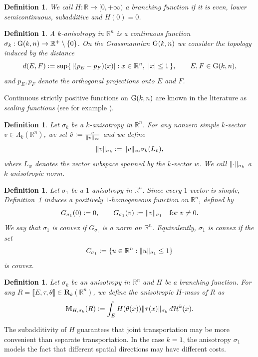 \documentclass{article}
\numberwithin{equation}{section}
\theoremstyle{plain}%
\newtheorem{defin}[theorem]{Definition}
\theoremstyle{definition}
\theoremstyle{definition}
\newcommand{\rgrande}{\mathbb{R}}
\newcommand{\haus}{\mathcal{H}}
\newcommand{\corrett}{\mathbf{R}_k(\rgrande^n)}
\newcommand{\massaanisotropa}{\mathbb{M}_{H,\sigma_k}}
\newcommand{\grass}{{\rm G}}
\newcommand{\grasskn}{\grass(k,n)}
\newcommand{\vettgen}[2]{\Lambda_{#1}(\rgrande^{#2})}
\DeclarePairedDelimiter{\norma}{\lVert}{\rVert} %
\begin{document}
\begin{defin}
    We call $H: \rgrande \to [ 0,+ \infty)$ a \textit{branching function} if it is even, lower semicontinuous, subadditive and $H(0)=0$.
\end{defin}
\begin{defin}
    A \textit{$k$-anisotropy in $\rgrande^n$} is a continuous function $\sigma_k : \grasskn \to \rgrande^+ \setminus \{ 0 \}$. On the Grassmannian $\grasskn$ we consider the topology induced by the distance  
    $$d(E,F)\vcentcolon=
    \sup\{\, |(p_E-p_F)(x)| : x\in \rgrande^n,\ |x|\le 1\,\},
    \qquad E,F\in\grasskn,$$
    and $p_E,p_F$ denote the orthogonal projections onto $E$ and $F$.
\end{defin}
Continuous strictly positive functions on $\grasskn$ are known in the literature as \textit{scaling functions} (see for example \cite{MR1462734}).
\begin{defin}\label{defnormaanisotropa}
     Let $\sigma_k$ be a $k$-anisotropy in $\rgrande^n$. For any nonzero simple $k$-vector $v \in \vettgen{k}{n}$, we set $\hat{v} \vcentcolon = \frac{v}{\norma{v}_{\infty}}$ and we define
    $$
    \norma{v}_{\sigma_k} \vcentcolon =  \norma{v}_{\infty} \sigma_k (L_{\hat{v}})
    \text{,}
    $$
    where $L_w$ denotes the vector subspace spanned by the $k$-vector $w$. We call $\norma{\cdot}_{\sigma_k}$ a \textit{$k$-anisotropic norm}.
\end{defin}

\begin{defin}\label{defconvex1anis}
Let $\sigma_1$ be a $1$-anisotropy in $\rgrande^n$. Since every $1$-vector is simple, Definition~\ref{defnormaanisotropa} induces a positively $1$-homogeneous function on $\rgrande^n$, defined by
$$
G_{\sigma_1}(0)\vcentcolon=0,
\qquad
G_{\sigma_1}(v)\vcentcolon=\norma{v}_{\sigma_1}
\quad\text{for }v\neq 0.
$$
We say that $\sigma_1$ is \emph{convex} if $G_{\sigma_1}$ is a norm on $\rgrande^n$. Equivalently, $\sigma_1$ is convex if the set
$$
C_{\sigma_1}\vcentcolon=\{u\in \rgrande^n:\norma{u}_{\sigma_1}\le 1\}
$$
is convex.
\end{defin}

\begin{defin}\label{defmassaanisotropa}
Let $\sigma_k$ be an anisotropy in $\rgrande^n$ and $H $ be a branching function. For any $R = \llbracket E , \tau, \theta \rrbracket \in \corrett$, we define the anisotropic $H$-mass of $R$ as
$$
\massaanisotropa (R) \vcentcolon = \int_{E} {H(\theta(x)) \norma{\tau(x)}_{\sigma_k}} \,d \haus^k(x)
\text{.}
$$
\end{defin}
The subadditivity of $H$ guarantees that joint transportation may be more convenient than separate transportation. In the case $k=1$, the anisotropy $\sigma_1$ models the fact that different spatial directions may have different costs.
\end{document}
